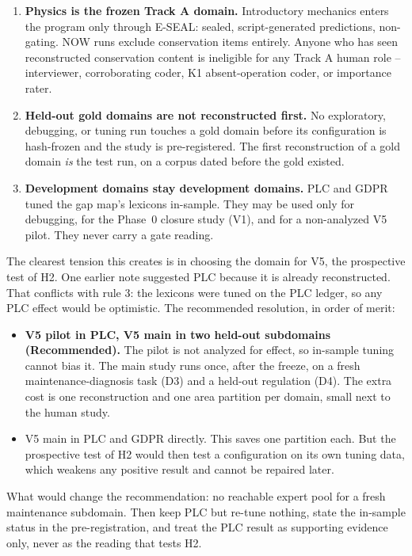 \begin{enumerate}
  \item \textbf{Physics is the frozen Track A domain.} Introductory mechanics enters the program
    only through E-SEAL: sealed, script-generated predictions, non-gating. NOW runs exclude
    conservation items entirely. Anyone who has seen reconstructed conservation content is
    ineligible for any Track A human role -- interviewer, corroborating coder, K1 absent-operation
    coder, or importance rater.
  \item \textbf{Held-out gold domains are not reconstructed first.} No exploratory, debugging, or
    tuning run touches a gold domain before its configuration is hash-frozen and the study is
    pre-registered. The first reconstruction of a gold domain \emph{is} the test run, on a corpus
    dated before the gold existed.
  \item \textbf{Development domains stay development domains.} PLC and GDPR tuned the gap map's
    lexicons in-sample. They may be used only for debugging, for the Phase~0 closure study (V1),
    and for a non-analyzed V5 pilot. They never carry a gate reading.
\end{enumerate}

The clearest tension this creates is in choosing the domain for V5, the prospective test of H2.
One earlier note suggested PLC because it is already reconstructed. That conflicts with rule 3:
the lexicons were tuned on the PLC ledger, so any PLC effect would be optimistic.
The recommended resolution, in order of merit:

\begin{itemize}[noitemsep]
  \item \textbf{V5 pilot in PLC, V5 main in two held-out subdomains (Recommended).} The pilot
    is not analyzed for effect, so in-sample tuning cannot bias it. The main study runs once,
    after the freeze, on a fresh maintenance-diagnosis task (D3) and a held-out regulation (D4).
    The extra cost is one reconstruction and one area partition per domain, small next to the
    human study.
  \item V5 main in PLC and GDPR directly. This saves one partition each. But the prospective
    test of H2 would then test a configuration on its own tuning data, which weakens any positive
    result and cannot be repaired later.
\end{itemize}
What would change the recommendation: no reachable expert pool for a fresh maintenance
subdomain. Then keep PLC but re-tune nothing, state the in-sample status in the pre-registration,
and treat the PLC result as supporting evidence only, never as the reading that tests H2.
